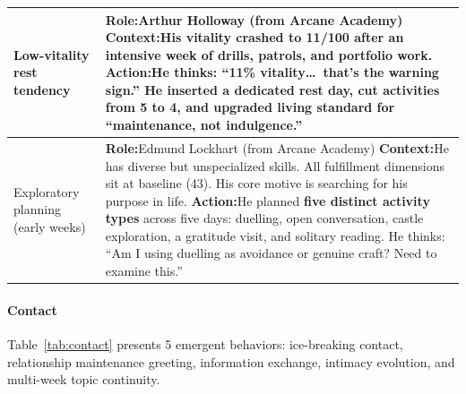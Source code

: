 \begin{table}[t]
\begin{tabular}{p{0.8in}p{4.3in}}
  Low-vitality \newline rest \newline tendency
  &
  \textbf{Role:}\quad Arthur Holloway \hfill (from Arcane Academy) \newline
  \textbf{Context:}\quad His vitality crashed to \textbf{11/100} after an intensive week of drills, patrols, and portfolio work. \newline
  \textbf{Action:}\quad He thinks: ``11\% vitality\ldots\ that's the warning sign.'' He inserted a \textbf{dedicated rest day}, cut activities from 5 to 4, and upgraded living standard for ``maintenance, not indulgence.''
  \\
  \midrule
  
  Exploratory \newline planning \newline (early weeks)
  &
  \textbf{Role:}\quad Edmund Lockhart \hfill (from Arcane Academy) \newline
  \textbf{Context:}\quad He has diverse but unspecialized skills. All fulfillment dimensions sit at baseline (43). His core motive is searching for his purpose in life. \newline
  \textbf{Action:}\quad He planned \textbf{five distinct activity types} across five days: duelling, open conversation, castle exploration, a gratitude visit, and solitary reading. He thinks: ``Am I using duelling as avoidance or genuine craft? Need to examine this.''
  \\
  \bottomrule
  \end{tabular}
  \end{table}

\paragraph{Contact}
Table~\ref{tab:contact} presents 5 emergent behaviors:
ice-breaking contact, relationship maintenance greeting, information exchange, intimacy evolution, and multi-week topic continuity.

